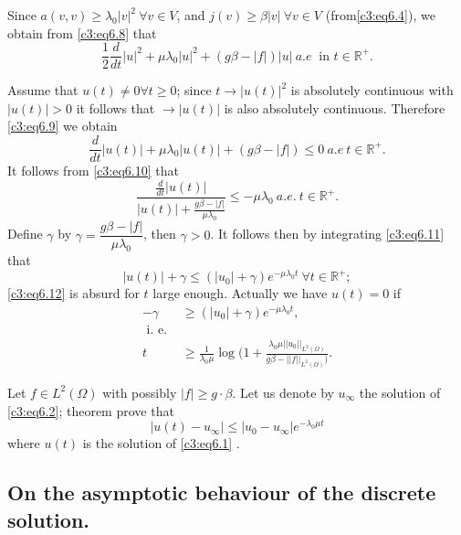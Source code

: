 Since $a (v, v) \geq \lambda_0 |v|^2 \ \forall v \in V$, and $j (v) \geq \beta |v| \ \forall v \in V$ (from\eqref{c3:eq6.4}), we obtain from \eqref{c3:eq6.8} that 
\begin{equation}
\frac{1}{2} \frac{d}{dt} |u|^2 + \mu \lambda_0 |u|^2 + (g \beta - |f|) |u| ~ a.e ~ \text{ in } t \in \mathbb{R}^+. \tag{6.9}\label{c3:eq6.9}
\end{equation}

Assume that $u (t) \neq 0 \forall t \geq 0$; since $t \to |u (t)|^2$ is absolutely continuous with $|u (t)| > 0$ it follows that $\to |u (t)|$ is also absolutely continuous. Therefore \eqref{c3:eq6.9} we obtain
\begin{equation}
\frac{d}{dt} |u (t)| + \mu \lambda_0 |u (t)| + (g \beta - |f|) \leq 0 ~ a.e ~ t \in \mathbb{R}^+. \tag{6.10}\label{c3:eq6.10}
\end{equation}\pageoriginale 
It follows from \eqref{c3:eq6.10} that
\begin{equation}
\frac{\frac{d}{dt} |u (t)|} {|u (t)| + \frac{g \beta - |f|}{\mu \lambda_0}} \leq - \mu \lambda_0 ~ a.e. ~ t \in \mathbb{R}^+. \tag{6.11}\label{c3:eq6.11}
\end{equation}
Define $\gamma$ by $\gamma = \dfrac {g \beta - |f|} {\mu \lambda_0}$, then $\gamma > 0$. It follows then by integrating \eqref{c3:eq6.11} that 
\begin{equation}
|u (t)| + \gamma \leq  (|u_0| + \gamma) e^{-\mu \lambda_0 t} \ \forall t \in \mathbb{R}^+ ; \tag{6.12}\label{c3:eq6.12}
\end{equation}
\eqref{c3:eq6.12} is absurd for $t$ large enough. Actually we have $u (t) = 0$ if
\begin{align*}
-  \gamma & \geq (|u_0| + \gamma) e^{- \mu \lambda_0 t}, \\
\text{ i. e. }\\
t & \geq \frac{1}{\lambda_0  \mu} \log (1 + \frac{\lambda_0 \mu || u_0 || _{L^2 (\Omega)}} {g \beta - ||f ||_{L^2 (\Omega)})}. \tag{6.13}\label{c3:eq6.13}
\end{align*}

\begin{exercise} %
Let $f \in L^2 (\Omega)$ with possibly $|f| \geq g \cdot \beta$. Let us denote by $u_\infty$ the solution of \eqref{c3:eq6.2}; theorem prove that
$$
|u (t)- u_\infty| \leq |u_0 - u_\infty| e^{-\lambda_0 \mu t}
$$
where $u(t)$ is the solution of \eqref{c3:eq6.1} .
\end{exercise}

\subsection{On the asymptotic behaviour of the discrete solution.}

